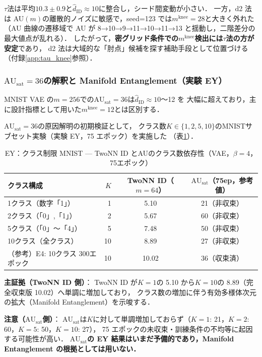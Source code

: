 \documentclass[11pt,a4paper]{jsarticle}
\newcommand{\AUsat}{\mathrm{AU}_{\mathrm{sat}}}
\newcommand{\mknee}{m^{\mathrm{knee}}}
\begin{document}
$\tau$法は平均$10.3 \pm 0.9$と$\hat{d}_\mathrm{ID} \approx 10$に整合し，シード間変動が小さい．
一方，d2 法は AU$(m)$の離散的ノイズに敏感で，seed=123 では$\mknee = 28$と大きく外れた
（AU 曲線の遷移域で AU が 8→10→9→11→10→11→13 と揺動し，二階差分の最大値点が乱れる）．
したがって，\textbf{密グリッド条件での$\mknee$検出には$\tau$法の方が安定}であり，
d2 法は大域的な「肘点」候補を探す補助手段として位置づける（付録\ref{app:tau_knee}参照）．

\subsubsection{$\AUsat = 36$の解釈と Manifold Entanglement（実験 EY）}

MNIST VAE の$m = 256$での$\AUsat = 36$は$\hat{d}_\mathrm{ID} \approx 10$〜12 を
大幅に超えており，主に設計指標として用いた$\mknee = 12$とは区別する．

$\AUsat = 36$の原因解明の初期検証として，
クラス数$K \in \{1, 2, 5, 10\}$のMNISTサブセット実験（実験 EY，75 エポック）を実施した
（表\ref{tab:ey}）．

\begin{table}[H]
\centering
\caption{EY：クラス制限 MNIST — TwoNN ID とAUのクラス数依存性（VAE，$\beta=4$，75エポック）}
\label{tab:ey}
\small
\begin{tabular}{lrcc}
\toprule
クラス構成 & $K$ & TwoNN ID（$m=64$） & $\AUsat$（75ep，参考値） \\
\midrule
1クラス（数字「1」） & 1  & 5.10 & 21（非収束） \\
2クラス（「0」,「1」） & 2  & 5.67 & 60（非収束） \\
5クラス（「0」〜「4」）& 5  & 7.48 & 50（非収束） \\
10クラス（全クラス）  & 10 & 8.89 & 27（非収束） \\
\midrule
（参考）E4: 10クラス 300エポック & 10 & 10.02 & 36（収束済） \\
\bottomrule
\end{tabular}
\end{table}

\textbf{主証拠（TwoNN ID 側）}：
TwoNN ID が$K = 1$の 5.10 から$K = 10$の 8.89（完全収束版 10.02）へ単調に増加しており，
クラス数の増加に伴う有効多様体次元の拡大（Manifold Entanglement）を示唆する．

\textbf{注意（$\AUsat$側）}：
$\AUsat$は$K$に対して単調増加しておらず（$K=1$: 21，$K=2$: 60，$K=5$: 50，$K=10$: 27），
75 エポックの未収束・訓練条件の不均等に起因する可能性が高い．
\textbf{$\AUsat$の EY 結果はいまだ予備的であり，Manifold Entanglement の根拠としては用いない．}
\end{document}
